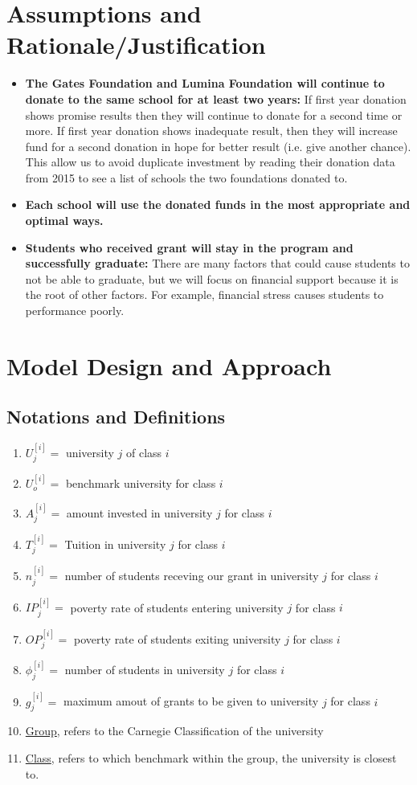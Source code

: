 \documentclass[12pt]{article}
\begin{document}
\section{Assumptions and Rationale/Justification}
	\begin{itemize}
		\item \textbf{The Gates Foundation and Lumina Foundation will continue to donate to the same school for at least two years:} If first year donation shows promise results then they will continue to donate for a second time or more. If first year donation shows inadequate result, then they will increase fund for a second donation in hope for better result (i.e. give another chance). This allow us to avoid duplicate investment by reading their donation data from 2015 to see a list of schools the two foundations donated to. 
		
		\item \textbf{Each school will use the donated funds in the most appropriate and optimal ways.}
		
		\item \textbf{Students who received grant will stay in the program and successfully graduate:} There are many factors that could cause students to not be able to graduate, but we will focus on financial support because it is the root of other factors. For example, financial stress causes students to performance poorly. 
	\end{itemize}
\clearpage
\section{Model Design and Approach}
	\subsection{Notations and Definitions}
	\begin{enumerate}
		\item $U_j^{[i]} = $ university $j$ of class $i$
		\item $U_o^{[i]} = $ benchmark university for class $i$
		\item $A_j^{[i]} = $ amount invested in university $j$ for class $i$
		\item $T_j^{[i]} = $ Tuition in university $j$ for class $i$
		\item $n_j^{[i]} = $ number of students receving our grant in university $j$ for class $i$
		\item $IP_j^{[i]} = $ poverty rate of students entering university $j$ for class $i$
		\item $OP_j^{[i]} = $ poverty rate of students exiting university $j$ for class $i$
		\item $\phi_j^{[i]} = $ number of students in university $j$ for class $i$
		\item $g_j^{[i]} = $ maximum amout of grants to be given to university $j$ for class $i$
		\item \underline{Group}, refers to the Carnegie Classification of the university
		\item \underline{Class}, refers to which benchmark within the group, the university is closest to.
	\end{enumerate}
	
\end{document}
